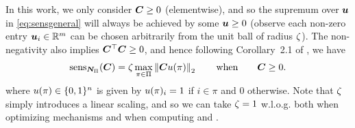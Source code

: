 In this work, we only consider ${\bm{C}} \ge 0$ (elementwise), and so the supremum over ${\bm{u}}$ in \cref{eq:sensgeneral} will always be achieved by some ${\bm{u}} \ge 0$ (observe each non-zero entry ${\bm{u}}_i \in \mathbb{R}^m$ can be chosen arbitrarily from the unit ball of radius $\zeta$). The non-negativity also implies ${\bm{C}}^\top {\bm{C}} \ge 0$, and hence following Corollary~2.1 of \citet{choquette22multiepoch}, we have
\begin{equation} \label{eq:sens}
  \operatorname{sens}_{{\bm{N}}_\Pi}({\bm{C}}) = \zeta \max_{\pi \in \Pi} \left\|{{\bm{C}} u(\pi)}\right\|_2 \qquad \text{when} \qquad {\bm{C}} \ge 0. 
\end{equation}
where $u(\pi) \in \{0, 1\}^{n}$ is given by $u(\pi)_i = 1$ if $i \in \pi$ and $0$ otherwise. Note that $\zeta$ simply introduces a linear scaling, and so we can take $\zeta=1$ w.l.o.g. both when optimizing mechanisms and when computing \maxloss and \rmsloss.


